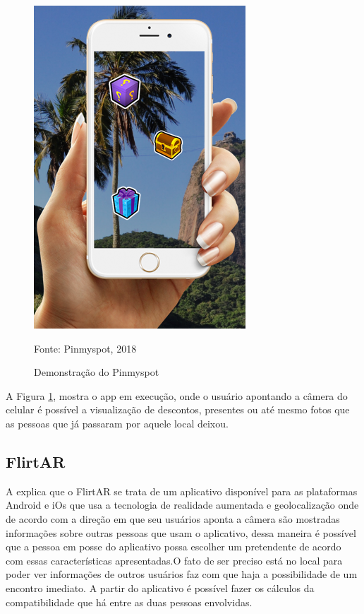 	\begin{figure}[H]
		\centering
		\includegraphics[scale=0.7]{imagens/pinmyspot}
		\caption{Demonstração do Pinmyspot}
		Fonte: Pinmyspot, 2018
		\label{fig:pinmyspt} 
	\end{figure}
	
	A Figura \ref{fig:pinmyspt}, mostra o app em execução, onde o usuário apontando a câmera do celular é possível a visualização de descontos, presentes ou até mesmo fotos que as pessoas que já passaram por aquele local deixou.
	
	\subsection{FlirtAR}
	A  explica que o FlirtAR se trata de um aplicativo disponível para as plataformas Android e iOs que usa a tecnologia de realidade aumentada e geolocalização onde de acordo com a direção em que seu usuários aponta a câmera são mostradas informações sobre outras pessoas que usam o aplicativo, dessa maneira é possível que a pessoa em posse do aplicativo possa escolher um pretendente de acordo com essas características apresentadas.O fato de ser preciso está no local para poder ver informações de outros usuários faz com que haja a possibilidade de um encontro imediato. A partir do aplicativo é possível fazer os cálculos da compatibilidade que há entre as duas pessoas envolvidas.
	
